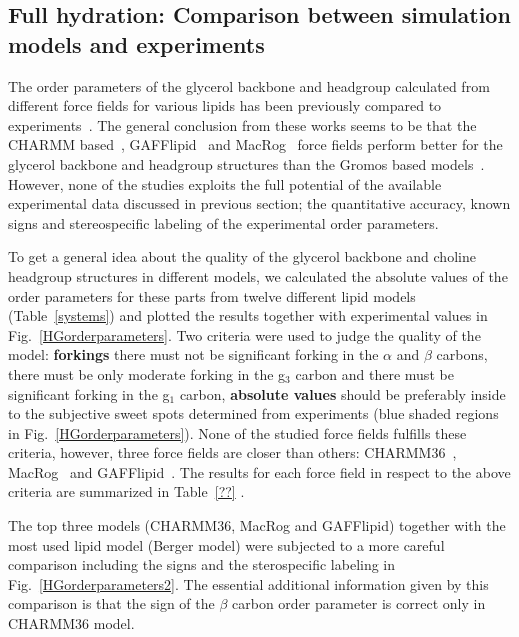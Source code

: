 \documentclass[pre,aps,floatfix,authordate1-4,twocolumn]{revtex4-1}
\begin{document}
\subsection{Full hydration: Comparison between simulation models and experiments}

The order parameters of the glycerol backbone and headgroup calculated from different force fields for various lipids has been 
previously compared to experiments~\cite{hogberg08,castro08,klauda10,kapla12,dickson12,poger12,ferreira13,chowdhary13,maciejewski14}. 
The general conclusion from these works seems to be that the CHARMM based~\cite{hogberg08,klauda10}, GAFFlipid~\cite{dickson12} and
MacRog~\cite{maciejewski14} force fields perform better for the glycerol backbone and headgroup structures than the Gromos based models~\cite{castro08,kapla12,poger12,ferreira13}.
However, none of the studies exploits the full potential of the available experimental data discussed in previous section; the quantitative accuracy, known signs and stereospecific labeling of
the experimental order parameters.

To get a general idea about the quality of the glycerol backbone and choline headgroup structures in different models, we calculated the absolute
values of the order parameters for these parts from twelve  different lipid models (Table~\ref{systems}) and 
plotted the results together with experimental values in Fig.~\ref{HGorderparameters}.
Two criteria were used to judge the quality of the model: {\bf forkings} there must not be significant forking in the $\alpha$ and $\beta$ carbons,
there must be only moderate forking in the g$_3$ carbon and there must be significant forking in the g$_1$ carbon, {\bf absolute values}
should be preferably inside to the subjective sweet spots determined from experiments (blue shaded regions in Fig.~\ref{HGorderparameters}).
None of the studied force fields fulfills these criteria, however, three force fields are closer than others: CHARMM36~\cite{klauda10}, MacRog~\cite{maciejewski14} and GAFFlipid~\cite{dickson12}.
The results for each force field in respect to the above criteria are summarized in Table~\ref{??} .

The top three models (CHARMM36, MacRog and GAFFlipid) together with the most used lipid model (Berger model) 
were subjected to a more careful comparison including the signs and the sterospecific labeling in Fig.~\ref{HGorderparameters2}.
The essential additional information given by this comparison is that the sign of the $\beta$ carbon order parameter is correct only in CHARMM36 model.
\end{document}
